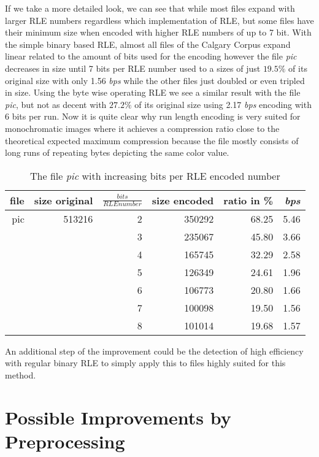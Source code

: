 \par{
If we take a more detailed look, we can see that while most files expand with larger RLE numbers regardless which implementation of RLE, but some files have their minimum size when encoded with higher RLE numbers of up to 7 bit. With the simple binary based RLE, almost all files of the Calgary Corpus expand linear related to the amount of bits used for the encoding however the file \textit{pic} decreases in size until 7 bits per RLE number used to a sizes of just $19.5 \%$ of its original size with only  1.56 \textit{bps} while the other files just doubled or even tripled in size. Using the byte wise operating RLE we see a similar result with the file \textit{pic}, but not as decent with $27.2\%$ of its original size using 2.17 \textit{bps} encoding with 6 bits per run. Now it is quite clear why run length encoding is very suited for monochromatic images where it achieves a compression ratio close to the theoretical expected maximum compression because the file mostly consists of long runs of repeating bytes depicting the same color value.

\begin{table}[H]
	\centering
	\begin{tabular}{r|r|r|r|r|r}	
		file & size original & $\frac{bits}{RLE number}$ & size encoded & ratio in \% & \textit{bps}\\
		\hline
		pic & 513216 & 2 & 350292 & 68.25 & 5.46 \\
		 & & 3 & 235067 & 45.80 & 3.66\\
		 & & 4 & 165745 & 32.29 & 2.58\\
		 & & 5 & 126349 & 24.61 & 1.96\\
		 & & 6 & 106773 & 20.80 & 1.66\\
		 & & 7 & 100098 & 19.50 & 1.56\\
		 & & 8 & 101014 & 19.68 & 1.57\\		 
	\end{tabular}
	\caption{The file \textit{pic} with increasing bits per RLE encoded number}
	\label{tab:t40 The file pic with increasing bits per RLE encoded number}
\end{table}	
}

\par{
An additional step of the improvement could be the detection of high efficiency with regular binary RLE to simply apply this to files highly suited for this method.
}

\section{Possible Improvements by Preprocessing}
\label{ch:Analysis:sec:Improvements by Preprocessing}

